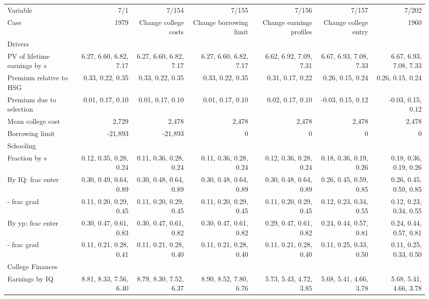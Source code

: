 \begin{tabular}{lrrrrrr}
\hline
Variable & 7/1  & 7/154  & 7/155  & 7/156  & 7/157  & 7/202  \\ 
Case & 1979  & Change college costs  & Change borrowing limit  & Change earnings profiles  & Change college entry  & 1960  \\ 
Drivers &   &   &   &   &   &   \\ 
PV of lifetime earnings by s & 6.27, 6.60, 6.82, 7.17  & 6.27, 6.60, 6.82, 7.17  & 6.27, 6.60, 6.82, 7.17  & 6.62, 6.92, 7.09, 7.31  & 6.67, 6.93, 7.08, 7.33  & 6.67, 6.93, 7.08, 7.33  \\ 
Premium relative to HSG & 0.33, 0.22, 0.35  & 0.33, 0.22, 0.35  & 0.33, 0.22, 0.35  & 0.31, 0.17, 0.22  & 0.26, 0.15, 0.24  & 0.26, 0.15, 0.24  \\ 
Premium due to selection & 0.01, 0.17, 0.10  & 0.01, 0.17, 0.10  & 0.01, 0.17, 0.10  & 0.02, 0.17, 0.10  & -0.03, 0.15, 0.12  & -0.03, 0.15, 0.12  \\ 
Mean college cost & 2,729  & 2,478  & 2,478  & 2,478  & 2,478  & 2,478  \\ 
Borrowing limit & -21,893  & -21,893  & 0  & 0  & 0  & 0  \\ 
\hline
Schooling &   &   &   &   &   &   \\ 
Fraction by s & 0.12, 0.35, 0.28, 0.24  & 0.11, 0.36, 0.28, 0.24  & 0.11, 0.36, 0.28, 0.24  & 0.12, 0.36, 0.28, 0.24  & 0.18, 0.36, 0.19, 0.26  & 0.18, 0.36, 0.19, 0.26  \\ 
By IQ: frac enter & 0.30, 0.49, 0.64, 0.89  & 0.30, 0.48, 0.64, 0.89  & 0.30, 0.48, 0.64, 0.89  & 0.30, 0.48, 0.64, 0.89  & 0.26, 0.45, 0.59, 0.85  & 0.26, 0.45, 0.59, 0.85  \\ 
- frac grad & 0.11, 0.20, 0.29, 0.45  & 0.11, 0.20, 0.29, 0.45  & 0.11, 0.20, 0.29, 0.45  & 0.11, 0.20, 0.29, 0.45  & 0.12, 0.23, 0.34, 0.55  & 0.12, 0.23, 0.34, 0.55  \\ 
By yp: frac enter & 0.30, 0.47, 0.61, 0.83  & 0.30, 0.47, 0.61, 0.82  & 0.30, 0.47, 0.61, 0.82  & 0.29, 0.47, 0.61, 0.82  & 0.24, 0.44, 0.57, 0.81  & 0.24, 0.44, 0.57, 0.81  \\ 
- frac grad & 0.11, 0.21, 0.28, 0.41  & 0.11, 0.21, 0.28, 0.40  & 0.11, 0.21, 0.28, 0.40  & 0.11, 0.21, 0.28, 0.40  & 0.11, 0.25, 0.33, 0.50  & 0.11, 0.25, 0.33, 0.50  \\ 
\hline
College Finances &   &   &   &   &   &   \\ 
Earnings by IQ & 8.81, 8.33, 7.56, 6.40  & 8.79, 8.30, 7.52, 6.37  & 8.90, 8.52, 7.80, 6.76  & 5.73, 5.43, 4.72, 3.85  & 5.68, 5.41, 4.66, 3.78  & 5.68, 5.41, 4.66, 3.78  \\ 

\end{tabular}
